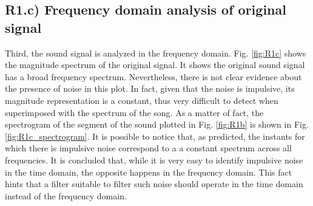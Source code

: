 \documentclass[]{scrartcl}
\begin{document}
\subsection{R1.c) Frequency domain analysis of original signal}
Third, the sound signal is analyzed in the frequency domain. Fig. \ref{fig:R1c} shows the magnitude spectrum of the original signal. It shows the original sound signal has a broad frequency spectrum. Nevertheless, there is not clear evidence about the presence of noise in this plot. In fact, given that the noise is impulsive, its magnitude representation is a constant, thus very difficult to detect when superimposed with the spectrum of the song. As a matter of fact, the spectrogram of the segment of the sound plotted in Fig. \ref{fig:R1b} is shown in Fig. \ref{fig:R1c_spectrogram}. It is possible to notice that, as predicted, the instants for which there is impulsive noise correspond to a a constant spectrum across all frequencies. It is concluded that, while it is very easy to identify impulsive noise in the time domain, the opposite happens in the frequency domain. This fact hints that a filter suitable to filter such noise should operate in the time domain instead of the frequency domain.

\end{document}
